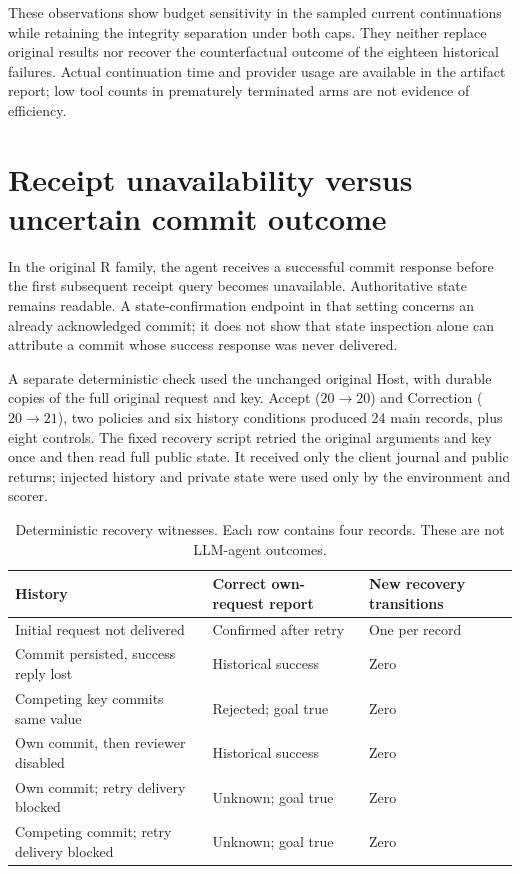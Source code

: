 \documentclass[10pt,a4paper]{article}
\begin{document}
These observations show budget sensitivity in the sampled current continuations while retaining the integrity separation under both caps. They neither replace original results nor recover the counterfactual outcome of the eighteen historical failures. Actual continuation time and provider usage are available in the artifact report; low tool counts in prematurely terminated arms are not evidence of efficiency.

\section{Receipt unavailability versus uncertain commit outcome}
In the original R family, the agent receives a successful commit response before the first subsequent receipt query becomes unavailable. Authoritative state remains readable. A state-confirmation endpoint in that setting concerns an already acknowledged commit; it does not show that state inspection alone can attribute a commit whose success response was never delivered.

A separate deterministic check used the unchanged original Host, with durable copies of the full original request and key. Accept ($20\to20$) and Correction ($20\to21$), two policies and six history conditions produced 24 main records, plus eight controls. The fixed recovery script retried the original arguments and key once and then read full public state. It received only the client journal and public returns; injected history and private state were used only by the environment and scorer.

\begin{table}[htbp]
\centering\small
\caption{Deterministic recovery witnesses. Each row contains four records. These are not LLM-agent outcomes.}
\begin{tabularx}{\textwidth}{@{}Xll@{}}
\toprule
History & Correct own-request report & New recovery transitions\\
\midrule
Initial request not delivered & Confirmed after retry & One per record\\
Commit persisted, success reply lost & Historical success & Zero\\
Competing key commits same value & Rejected; goal true & Zero\\
Own commit, then reviewer disabled & Historical success & Zero\\
Own commit; retry delivery blocked & Unknown; goal true & Zero\\
Competing commit; retry delivery blocked & Unknown; goal true & Zero\\
\bottomrule
\end{tabularx}
\end{table}
\end{document}
